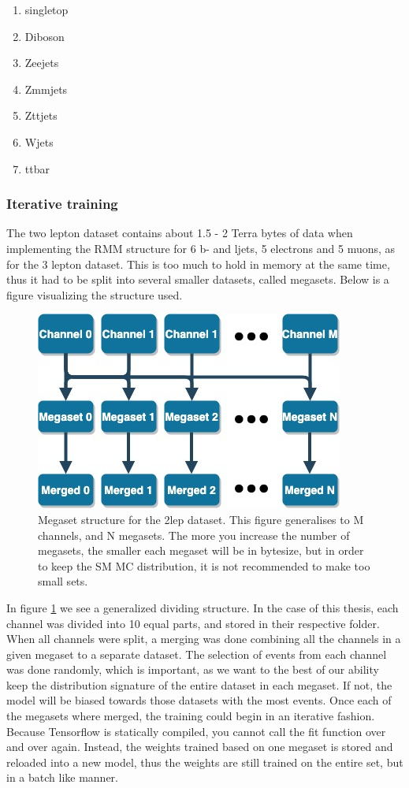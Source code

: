 \begin{enumerate}
    \item singletop 
    \item Diboson 
    \item Zeejets 
    \item Zmmjets 
    \item Zttjets 
    \item Wjets 
    \item ttbar
   
\end{enumerate}

 
\subsubsection*{Iterative training}
The two lepton dataset contains about 1.5 - 2 Terra bytes of data when implementing the RMM structure for 6 
b- and ljets, 5 electrons and 5 muons, as for the 3 lepton dataset. This is too much to hold in memory at the same time, thus it had to 
be split into several smaller datasets, called megasets. Below is a figure visualizing the structure used. 

\begin{figure}[h!]
    \centering
    \includegraphics[width=0.6\linewidth]{Figures/2lep_config/megaset_struct.jpeg}
    \caption{Megaset structure for the 2lep dataset. This figure generalises to M channels, and N megasets. The more you increase the number of megasets, 
    the smaller each megaset will be in bytesize, but in order to keep the SM MC distribution, it is not recommended to make too small sets.  }
    \label{fig:2lep_struct}
\end{figure}




In figure \ref{fig:2lep_struct} we see a generalized dividing structure. In the case of this thesis, each channel was divided into 10 equal parts, 
and stored in their respective folder. When all channels were 
split, a merging was done combining all the channels in a given megaset to a separate dataset. The selection of events from each channel was done randomly, 
which is important, as we want to the best of our ability keep the distribution signature of the entire dataset in each megaset. If not, the model will 
be biased towards those datasets with the most events. Once each of the megasets where merged, the training could begin in an iterative fashion. Because
Tensorflow is statically compiled, you cannot call the fit function over and over again. Instead, the weights trained based on one megaset is stored and 
reloaded into a new model, thus the weights are still trained on the entire set, but in a batch like manner. 

